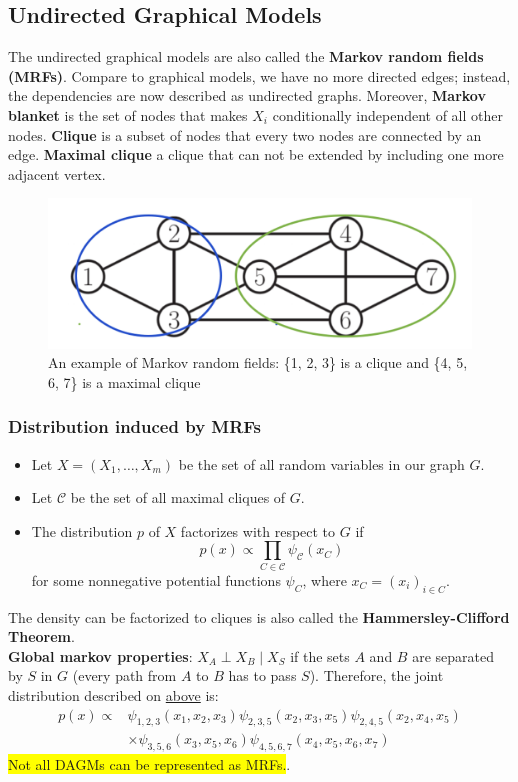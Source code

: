 \subsection{Undirected Graphical Models}
The undirected graphical models are also called the \textbf{Markov random fields (MRFs)}. Compare to graphical models, we have no more directed edges; instead, the dependencies are now described as undirected graphs. Moreover, \textbf{Markov blanket} is the set of nodes that makes $X_i$ conditionally independent of all other nodes. \textbf{Clique} is a subset of nodes that every two nodes are connected by an edge. \textbf{Maximal clique} a clique that can not be extended by including one more adjacent vertex.
\begin{figure}[H]
    \centering
    \includegraphics[width = .7\linewidth]{codes/figures/section2/figure_2_6.png}
    \caption{An example of Markov random fields: \{1, 2, 3\} is a clique and \{4, 5, 6, 7\} is a maximal clique}
    \label{fig:mrf}
\end{figure}
\subsubsection*{Distribution induced by MRFs}
\begin{itemize}
    \item Let $X=\left(X_1, \ldots, X_m\right)$ be the set of all random variables in our graph $G$.
    \item Let $\mathcal{C}$ be the set of all maximal cliques of $G$.
    \item The distribution $p$ of $X$ factorizes with respect to $G$ if
$$
p(x) \propto \prod_{C \in \mathcal{C}} \psi_{\mathcal{C}}\left(x_C\right)
$$
for some nonnegative potential functions $\psi_C$, where $x_C=\left(x_i\right)_{i \in C}$.
\end{itemize}
The density can be factorized to cliques is also called the \textbf{Hammersley-Clifford Theorem}.\\
\textbf{Global markov properties}: $X_A\perp X_B\mid X_S$ if the sets $A$ and $B$ are separated by $S$ in $G$ (every path from $A$ to $B$ has to pass $S$).
Therefore, the joint distribution described on \hyperlink{fig:mrf}{above} is: 
\begin{align*}
  p(x) \propto & \psi_{1,2,3}\left(x_1, x_2, x_3\right) \psi_{2,3,5}\left(x_2, x_3, x_5\right) \psi_{2,4,5}\left(x_2, x_4, x_5\right) \\
  & \times \psi_{3,5,6}\left(x_3, x_5, x_6\right) \psi_{4,5,6,7}\left(x_4, x_5, x_6, x_7\right)
  \end{align*}
\colorbox{yellow}{Not all DAGMs can be represented as MRFs.}.\\
